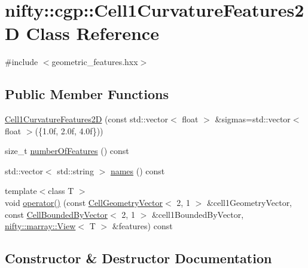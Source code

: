 \hypertarget{classnifty_1_1cgp_1_1Cell1CurvatureFeatures2D}{}\section{nifty\+:\+:cgp\+:\+:Cell1\+Curvature\+Features2D Class Reference}
\label{classnifty_1_1cgp_1_1Cell1CurvatureFeatures2D}


{\ttfamily \#include $<$geometric\+\_\+features.\+hxx$>$}

\subsection*{Public Member Functions}
\begin{DoxyCompactItemize}
\item 
\hyperlink{classnifty_1_1cgp_1_1Cell1CurvatureFeatures2D_af6e4ca198685673a68f2252ae140927c}{Cell1\+Curvature\+Features2D} (const std\+::vector$<$ float $>$ \&sigmas=std\+::vector$<$ float $>$(\{1.\+0f, 2.\+0f, 4.\+0f\}))
\item 
size\+\_\+t \hyperlink{classnifty_1_1cgp_1_1Cell1CurvatureFeatures2D_a2e017a75d7fb8f015eb6ae020328f7d6}{number\+Of\+Features} () const
\item 
std\+::vector$<$ std\+::string $>$ \hyperlink{classnifty_1_1cgp_1_1Cell1CurvatureFeatures2D_aaba27cb2a1f82c10bdef02bbd61a4ff8}{names} () const
\item 
{\footnotesize template$<$class T $>$ }\\void \hyperlink{classnifty_1_1cgp_1_1Cell1CurvatureFeatures2D_a23557b26a4039ab1ce2ba316511bf767}{operator()} (const \hyperlink{classnifty_1_1cgp_1_1CellGeometryVector}{Cell\+Geometry\+Vector}$<$ 2, 1 $>$ \&cell1\+Geometry\+Vector, const \hyperlink{classnifty_1_1cgp_1_1CellBoundedByVector}{Cell\+Bounded\+By\+Vector}$<$ 2, 1 $>$ \&cell1\+Bounded\+By\+Vector, \hyperlink{classandres_1_1View}{nifty\+::marray\+::\+View}$<$ T $>$ \&features) const
\end{DoxyCompactItemize}


\subsection{Constructor \& Destructor Documentation}
\mbox{\label{classnifty_1_1cgp_1_1Cell1CurvatureFeatures2D_af6e4ca198685673a68f2252ae140927c}} 
